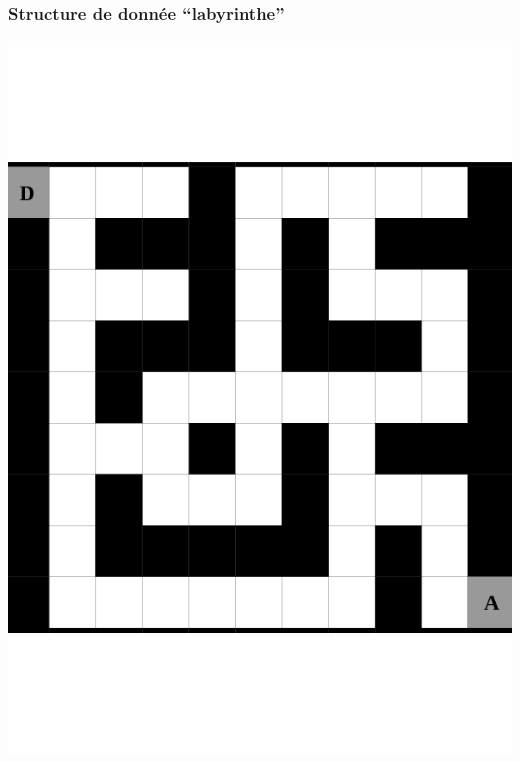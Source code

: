 \documentclass[]{beamer}
\begin{document}
\begin{frame}
 \frametitle{Structure de donnée ``labyrinthe''}
 \begin{minipage}{.3\linewidth}
   \includegraphics[width=\linewidth]{../diapos/V2bis/page1.png}
 \end{minipage}
 \begin{minipage}{.65\linewidth}

\end{minipage}
\end{frame}
\end{document}
